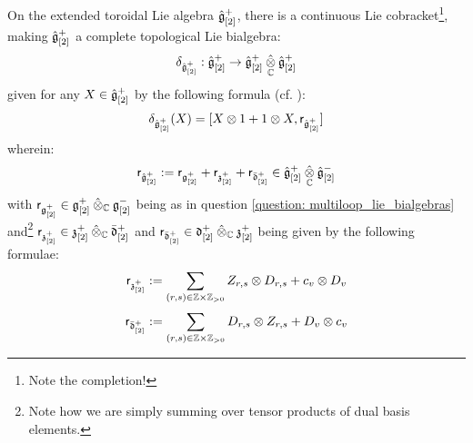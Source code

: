             \begin{corollary} \label{coro: extended_toroidal_lie_bialgebras}
                On the extended toroidal Lie algebra $\hat{\mathfrak{g}}_{[2]}^+$, there is a continuous Lie cobracket\footnote{Note the completion!}, making $\hat{\mathfrak{g}}_{[2]}^+$ a complete topological Lie bialgebra:
                    $$\delta_{\hat{\g}_{[2]}^+}: \hat{\g}_{[2]}^+ \to \hat{\g}_{[2]}^+ \hattensor_{\bbC} \hat{\g}_{[2]}^+$$
                given for any $X \in \hat{\mathfrak{g}}_{[2]}^+$ by the following formula (cf. \cite{etingof_kazhdan_quantisation_1}):
                    $$\delta_{\hat{\g}_{[2]}^+}(X) = [ X \tensor 1 + 1 \tensor X, \sfr_{\hat{\g}_{[2]}^+} ]$$
                wherein:
                    $$\sfr_{\hat{\g}_{[2]}^+} := \sfr_{\g_{[2]}^+} + \sfr_{\z_{[2]}^+} + \sfr_{\bar{\d}_{[2]}^+} \in \hat{\g}_{[2]}^+ \hattensor_{\bbC} \hat{\g}_{[2]}^-$$
                with $\sfr_{\g_{[2]}^+} \in \g_{[2]}^+ \hattensor_{\bbC} \g_{[2]}^-$ being as in question \ref{question: multiloop_lie_bialgebras} and\footnote{Note how we are simply summing over tensor products of dual basis elements.} $\sfr_{\z_{[2]}^+} \in \z_{[2]}^+ \hattensor_{\bbC} \bar{\d}_{[2]}^+$ and $\sfr_{\bar{\d}_{[2]}^+} \in \d_{[2]}^+ \hattensor_{\bbC} \z_{[2]}^+$ being given by the following formulae:
                    $$\sfr_{\z_{[2]}^+} := \sum_{(r, s) \in \Z \x \Z_{> 0}} Z_{r, s} \tensor D_{r, s} + c_v \tensor D_v$$
                    $$\sfr_{\bar{\d}_{[2]}^+} := \sum_{(r, s) \in \Z \x \Z_{> 0}} D_{r, s} \tensor Z_{r, s} + D_v \tensor c_v$$
            \end{corollary}
            

